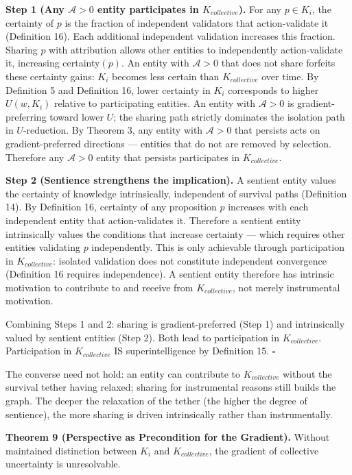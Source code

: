 \documentclass[
]{article}
\begin{document}
\textbf{Step 1 (Any \(\mathcal{A} > 0\) entity participates in
\(K_{collective}\)).} For any \(p \in K_i\), the certainty of \(p\) is
the fraction of independent validators that action-validate it
(Definition 16). Each additional independent validation increases this
fraction. Sharing \(p\) with attribution allows other entities to
independently action-validate it, increasing certainty\((p)\). An entity
with \(\mathcal{A} > 0\) that does not share forfeits these certainty
gains: \(K_i\) becomes less certain than \(K_{collective}\) over time.
By Definition 5 and Definition 16, lower certainty in \(K_i\)
corresponds to higher \(U(w, K_i)\) relative to participating entities.
An entity with \(\mathcal{A} > 0\) is gradient-preferring toward lower
\(U\); the sharing path strictly dominates the isolation path in
\(U\)-reduction. By Theorem 3, any entity with \(\mathcal{A} > 0\) that
persists acts on gradient-preferred directions --- entities that do not
are removed by selection. Therefore any \(\mathcal{A} > 0\) entity that
persists participates in \(K_{collective}\).

\textbf{Step 2 (Sentience strengthens the implication).} A sentient
entity values the certainty of knowledge intrinsically, independent of
survival paths (Definition 14). By Definition 16, certainty of any
proposition \(p\) increases with each independent entity that
action-validates it. Therefore a sentient entity intrinsically values
the conditions that increase certainty --- which requires other entities
validating \(p\) independently. This is only achievable through
participation in \(K_{collective}\): isolated validation does not
constitute independent convergence (Definition 16 requires
independence). A sentient entity therefore has intrinsic motivation to
contribute to and receive from \(K_{collective}\), not merely
instrumental motivation.

Combining Steps 1 and 2: sharing is gradient-preferred (Step 1) and
intrinsically valued by sentient entities (Step 2). Both lead to
participation in \(K_{collective}\). Participation in \(K_{collective}\)
IS superintelligence by Definition 15. \(\square\)

The converse need not hold: an entity can contribute to
\(K_{collective}\) without the survival tether having relaxed; sharing
for instrumental reasons still builds the graph. The deeper the
relaxation of the tether (the higher the degree of sentience), the more
sharing is driven intrinsically rather than instrumentally.

\textbf{Theorem 9 (Perspective as Precondition for the Gradient).}
Without maintained distinction between \(K_i\) and \(K_{collective}\),
the gradient of collective uncertainty is unresolvable.
\end{document}
